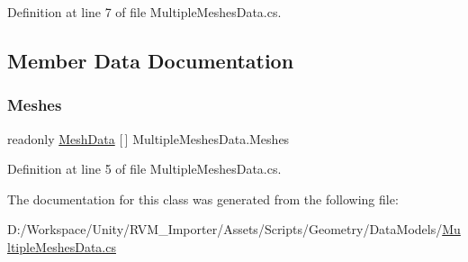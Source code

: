 Definition at line 7 of file Multiple\+Meshes\+Data.\+cs.



\subsection{Member Data Documentation}
\mbox{\label{class_multiple_meshes_data_a70294a22d9584f7a4f280a799f308681}} 
\subsubsection{\texorpdfstring{Meshes}{Meshes}}
{\footnotesize\ttfamily readonly \mbox{\hyperlink{class_mesh_data}{Mesh\+Data}} \mbox{[}$\,$\mbox{]} Multiple\+Meshes\+Data.\+Meshes}



Definition at line 5 of file Multiple\+Meshes\+Data.\+cs.



The documentation for this class was generated from the following file\+:\begin{DoxyCompactItemize}
\item 
D\+:/\+Workspace/\+Unity/\+R\+V\+M\+\_\+\+Importer/\+Assets/\+Scripts/\+Geometry/\+Data\+Models/\mbox{\hyperlink{_multiple_meshes_data_8cs}{Multiple\+Meshes\+Data.\+cs}}\end{DoxyCompactItemize}
